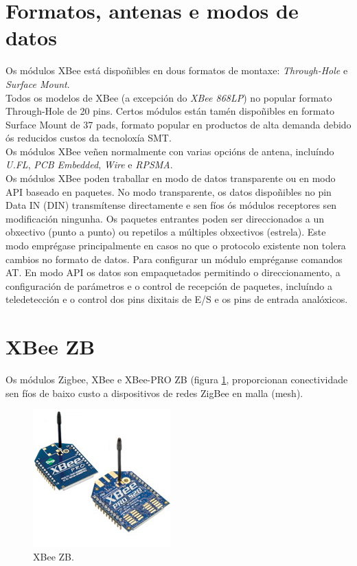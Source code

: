 \section{Formatos, antenas e modos de datos}

Os módulos XBee está dispoñibles en dous formatos de montaxe:
\textit{Through-Hole} e \textit{Surface Mount}. \\

Todos os modelos de XBee (a excepción do \textit{XBee 868LP}) no popular
formato Through-Hole de 20 pins. Certos módulos están tamén dispoñibles en
formato Surface Mount de 37 pads, formato popular en productos de alta demanda
debido ós reducidos custos da tecnoloxía SMT. \\

Os módulos XBee veñen normalmente con varias opcións de antena, incluíndo
\textit{U.FL}, \textit{PCB Embedded}, \textit{Wire} e \textit{RPSMA}. \\

Os módulos XBee poden traballar en modo de datos transparente ou en modo API
baseado en paquetes. No modo transparente, os datos dispoñibles no pin Data IN
(DIN) transmítense directamente e sen fíos ós módulos receptores sen
modificación ningunha. Os paquetes entrantes poden ser direccionados a un
obxectivo (punto a punto) ou repetilos a múltiples obxectivos (estrela). Este
modo emprégase principalmente en casos no que o protocolo existente non tolera
cambios no formato de datos. Para configurar un módulo empréganse comandos AT.
En modo API os datos son empaquetados permitindo o direccionamento, a
configuración de parámetros e o control de recepción de paquetes, incluíndo a
teledetección e o control dos pins dixitais de E/S e os pins de entrada
analóxicos.

\section{XBee ZB}

Os módulos Zigbee, XBee e XBee-PRO ZB (figura \ref{figura:XBeeZB-2},
proporcionan conectividade sen fíos de baixo custo a dispositivos de redes
ZigBee en malla (mesh).

\begin{figure}[htbp]
 \centering
 \includegraphics[scale=0.6,keepaspectratio=true]{./imagenes/xbee-zb.jpg}
 \caption{XBee ZB.}
 \label{figura:XBeeZB-2}
\end{figure}

